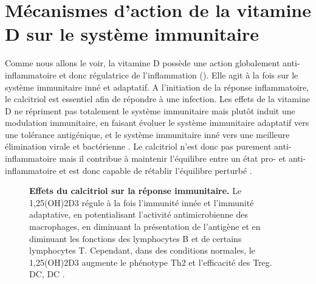 \documentclass[
  a4paper,
  DIV=11,
  numbers=noendperiod,
  listof=totoc]{scrreprt}
\begin{document}
\section{Mécanismes d'action de la vitamine D sur le système
immunitaire}\label{muxe9canismes-daction-de-la-vitamine-d-sur-le-systuxe8me-immunitaire}

Comme nous allons le voir, la vitamine D possède une action globalement
anti-inflammatoire et donc régulatrice de l'inflammation
(). Elle agit à la fois sur le système
immunitaire inné et adaptatif. A l'initiation de la réponse
inflammatoire, le calcitriol est essentiel afin de répondre à une
infection. Les effets de la vitamine D ne répriment pas totalement le
système immunitaire mais plutôt induit une modulation immunitaire, en
faisant évoluer le système immunitaire adaptatif vers une tolérance
antigénique, et le système immunitaire inné vers une meilleure
élimination virale et bactérienne \autocite{Martens.2020}. Le calcitriol
n'est donc pas purement anti-inflammatoire mais il contribue à maintenir
l'équilibre entre un état pro- et anti-inflammatoire et est donc capable
de rétablir l'équilibre perturbé \autocite{Dankers.2017}.

\begin{figure}


\caption[Effets du calcitriol sur la réponse
immunitaire.]{\label{fig-vd-immune-effect}\textbf{Effets du calcitriol
sur la réponse immunitaire.} Le \ac{1,25(OH)2D3} régule à la fois
l'immunité innée et l'immunité adaptative, en potentialisant l'activité
antimicrobienne des macrophages, en diminuant la présentation de
l'antigène et en diminuant les fonctions des lymphocytes B et de
certains lymphocytes T. Cependant, dans des conditions normales, le
\ac{1,25(OH)2D3} augmente le phénotype \ac{Th2} et l'efficacité des
\ac{Treg}. \acs{DC}, \acl{DC} \autocite{Cutolo.2014}.}

\end{figure}%
\end{document}
